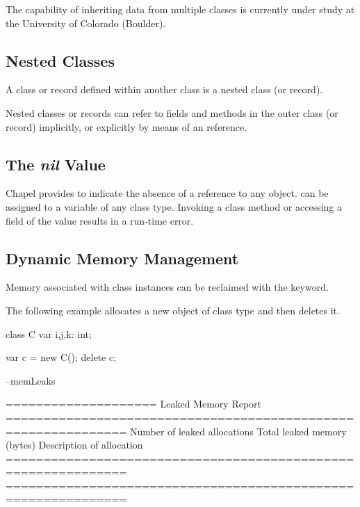 \begin{openissue}
The capability of inheriting data from multiple classes is currently under study
at the University of Colorado (Boulder).
\end{openissue}

\subsection{Nested Classes}
\label{Nested_Classes}

A class or record defined within another class is a nested class (or record).

Nested classes or records can refer to fields and methods in the outer class (or
record) implicitly, or explicitly by means of an  reference.

\subsection{The {\em nil} Value}

Chapel provides  to indicate the absence of a reference to
any object.   can be assigned to a variable of any class
type.  Invoking a class method or accessing a field of the 
value results in a run-time error.

\subsection{Dynamic Memory Management}
\label{Dynamic_Memory_Management}
\label{Class_Delete}

Memory associated with class instances can be reclaimed with the 
keyword.

\begin{example}
The following example allocates a new object  of class type 
and then deletes it.
\begin{chapelpre}
class C {
  var i,j,k: int;
}
\end{chapelpre}
\begin{chapel}
var c = new C();
delete c;
\end{chapel}
\begin{chapelpost}
\end{chapelpost}
\begin{chapelexecopts}
--memLeaks
\end{chapelexecopts}
\begin{chapeloutput}

====================
Leaked Memory Report
==============================================================
Number of leaked allocations
           Total leaked memory (bytes)
                      Description of allocation
==============================================================
==============================================================
\end{chapeloutput}
\end{example}

